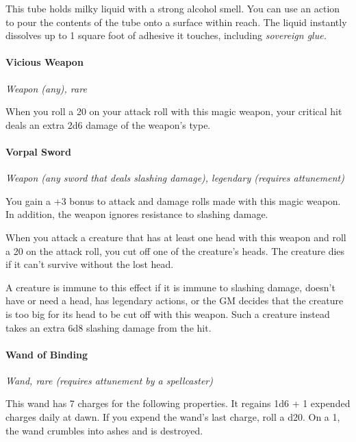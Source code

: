 \documentclass[
]{article}
\begin{document}
This tube holds milky liquid with a strong alcohol smell. You can use an
action to pour the contents of the tube onto a surface within reach. The
liquid instantly dissolves up to 1 square foot of adhesive it touches,
including \emph{sovereign glue.}

\hypertarget{vicious-weapon}{%
\paragraph{Vicious Weapon}\label{vicious-weapon}}

\emph{Weapon (any), rare}

When you roll a 20 on your attack roll with this magic weapon, your
critical hit deals an extra 2d6 damage of the weapon's type.

\hypertarget{vorpal-sword}{%
\paragraph{Vorpal Sword}\label{vorpal-sword}}

\emph{Weapon (any sword that deals slashing damage), legendary (requires
attunement)}

You gain a +3 bonus to attack and damage rolls made with this magic
weapon. In addition, the weapon ignores resistance to slashing damage.

When you attack a creature that has at least one head with this weapon
and roll a 20 on the attack roll, you cut off one of the creature's
heads. The creature dies if it can't survive without the lost head.

A creature is immune to this effect if it is immune to slashing damage,
doesn't have or need a head, has legendary actions, or the GM decides
that the creature is too big for its head to be cut off with this
weapon. Such a creature instead takes an extra 6d8 slashing damage from
the hit.

\hypertarget{wand-of-binding}{%
\paragraph{Wand of Binding}\label{wand-of-binding}}

\emph{Wand, rare (requires attunement by a spellcaster)}

This wand has 7 charges for the following properties. It regains 1d6 + 1
expended charges daily at dawn. If you expend the wand's last charge,
roll a d20. On a 1, the wand crumbles into ashes and is destroyed.
\end{document}
